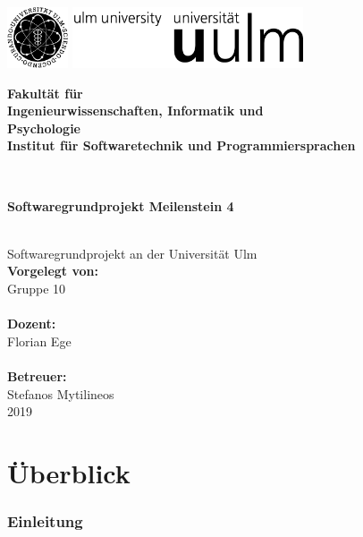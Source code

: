 \documentclass[a4paper,12pt,
headsepline,           %
oneside,               %
pointlessnumbers,      %
bibtotoc,              %
]{scrartcl}
\newcommand{\fullname}{Gruppe 10}
\newcommand{\titel}{Softwaregrundprojekt Meilenstein 4}
\newcommand{\jahr}{2019}
\newcommand{\dozent}{Florian Ege}
\newcommand{\betreuer}{Stefanos Mytilineos}
\newcommand{\fakultaet}{Ingenieurwissenschaften, Informatik und\\Psychologie}
\newcommand{\institut}{Institut für Softwaretechnik und Programmiersprachen}
\begin{document}
    \thispagestyle{empty}
    \begin{addmargin*}[4mm]{-10mm}

        \includegraphics[height=1.8cm]{images/unilogo_bild}
        \hfill
        \includegraphics[height=1.8cm]{images/unilogo_wort}\\[1em]

        {\footnotesize
        \hspace*{115mm}\parbox[t]{35mm}{\bfseries Fakultät für\\
        \fakultaet\\
        \mdseries \institut}\\[2cm]

        \parbox{140mm}{\bfseries \LARGE \titel}\\[2.5em]
        {\footnotesize Softwaregrundprojekt an der Universität Ulm}\\[3em]

        {\footnotesize \bfseries Vorgelegt von:}\\
        {\footnotesize \fullname\\}\\ [1em]
        {\footnotesize \bfseries Dozent:}\\
        {\footnotesize \dozent\\}\\[1em]
        {\footnotesize \bfseries Betreuer:}\\
        {\footnotesize \betreuer}\\ [1em]
        {\footnotesize \jahr}
        }
    \end{addmargin*}
    \pagebreak
    \tableofcontents
    \pagebreak

    \part{Überblick}
    \section{Einleitung}
\end{document}
